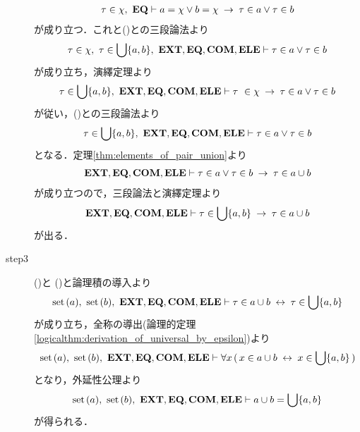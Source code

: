 \begin{sketch}
\begin{description}
\begin{align}
					\tau \in \chi,\ \mbox{{\bf EQ}} \vdash a = \chi \vee b = \chi \hspace{0.25em}\rightarrow\hspace{0.25em} \tau \in a \vee \tau \in b
				\end{align}
				が成り立つ．これと()との三段論法より
				\begin{align}
					\tau \in \chi,\ \tau \in \bigcup \{a,b\},\ \EXTAX,\EQAX,\COMAX,\ELEAX 
					\vdash \tau \in a \vee \tau \in b
				\end{align}
				が成り立ち，演繹定理より
				\begin{align}
					\tau \in \bigcup \{a,b\},\ \EXTAX,\EQAX,\COMAX,\ELEAX 
					\vdash \tau\ \in \chi \rarrow \tau \in a \vee \tau \in b
				\end{align}
				が従い，()との三段論法より
				\begin{align}
					\tau \in \bigcup \{a,b\},\ \EXTAX,\EQAX,\COMAX,\ELEAX 
					\vdash \tau \in a \vee \tau \in b
				\end{align}
				となる．定理\ref{thm:elements_of_pair_union}より
				\begin{align}
					\mbox{{\bf EXT}},\mbox{{\bf EQ}},\mbox{\bf COM},\mbox{{\bf ELE}} \vdash \tau \in a \vee \tau \in b \hspace{0.25em}\rightarrow\hspace{0.25em} \tau \in a \cup b
				\end{align}
				が成り立つので，三段論法と演繹定理より
				\begin{align}
					\mbox{{\bf EXT}},\mbox{{\bf EQ}},\mbox{\bf COM},\mbox{{\bf ELE}} \vdash \tau \in \bigcup \{a,b\} \hspace{0.25em}\rightarrow\hspace{0.25em} \tau \in a \cup b
					\label{fom:union_of_two_sets_is_union_of_pair_4}
				\end{align}
				が出る．
				
			\item[step3] ()と
				()と論理積の導入より
				\begin{align}
					\operatorname*{set}\hspace{0.15em}(a),\ \operatorname*{set}\hspace{0.15em}(b),\ \mbox{{\bf EXT}},\mbox{{\bf EQ}},\mbox{\bf COM},\mbox{{\bf ELE}} \vdash 
					\tau \in a \cup b \hspace{0.25em}\leftrightarrow\hspace{0.25em} \tau \in \bigcup \{a,b\}
				\end{align}
				が成り立ち，全称の導出(論理的定理\ref{logicalthm:derivation_of_universal_by_epsilon})より
				\begin{align}
					\operatorname*{set}\hspace{0.15em}(a),\ \operatorname*{set}\hspace{0.15em}(b),\ \mbox{{\bf EXT}},\mbox{{\bf EQ}},\mbox{\bf COM},\mbox{{\bf ELE}} \vdash 
					\forall x\, (\, x \in a \cup b \hspace{0.25em}\leftrightarrow\hspace{0.25em} x \in \bigcup \{a,b\}\, )
				\end{align}
				となり，外延性公理より
				\begin{align}
					\operatorname*{set}\hspace{0.15em}(a),\ \operatorname*{set}\hspace{0.15em}(b),\ \mbox{{\bf EXT}},\mbox{{\bf EQ}},\mbox{\bf COM},\mbox{{\bf ELE}} \vdash a \cup b = \bigcup \{a,b\}
				\end{align}
				が得られる．
				\QED
		\end{description}
	\end{sketch}
	
